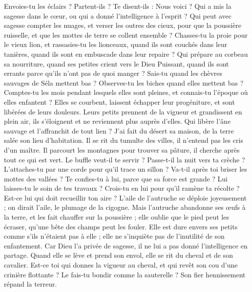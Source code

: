 \begin{multicols}{2}
Envoies-tu les éclairs ? Partent-ils ? Te disent-ils : Nous voici ?
Qui a mis la sagesse dans le cœur, ou qui a donné l'intelligence à l'esprit ?
Qui peut avec sagesse compter les nuages, et verser les outres des cieux,
pour que la poussière ruisselle, et que les mottes de terre se collent ensemble ?
\VerseOne{}Chasses-tu la proie pour le vieux lion, et rassasies-tu les lionceaux,
quand ils sont couchés dans leur tanières, quand ils sont en embuscade dans leur repaire ?
Qui prépare au corbeau sa nourriture, quand ses petites crient vers le Dieu Puissant, quand ils sont errants parce qu’ils n’ont pas de quoi manger ?
Sais-tu quand les chèvres sauvages de Séla mettent bas ? Observes-tu les biches quand elles mettent bas ?
Comptes-tu les mois pendant lesquels elles sont pleines, et connais-tu l'époque où elles enfantent ?
Elles se courbent, laissent échapper leur progéniture, et sont libérées de leurs douleurs.
Leurs petits prennent de la vigueur et grandissent en plein air, ils s'éloignent et ne reviennent plus auprès d'elles.
Qui libère l'âne sauvage et l'affranchit de tout lien ?
J'ai fait du désert sa maison, de la terre salée son lieu d'habitation.
Il se rit du tumulte des villes, il n'entend pas les cris d'un maître.
Il parcourt les montagnes pour trouver sa pâture, il cherche après tout ce qui est vert.
Le buffle veut-il te servir ? Passe-t-il la nuit vers ta crèche ?
L'attaches-tu par une corde pour qu'il trace un sillon ? Va-t-il après toi briser les mottes des vallées ?
Te confies-tu à lui, parce que sa force est grande ? Lui laisses-tu le soin de tes travaux ?
Crois-tu en lui pour qu'il ramène ta récolte ? Est-ce lui qui doit recueillir ton aire ?
L'aile de l'autruche se déploie joyeusement ; on dirait l'aile, le plumage de la cigogne.
Mais l'autruche abandonne ses œufs à la terre, et les fait chauffer sur la poussière ;
elle oublie que le pied peut les écraser, qu'une bête des champs peut les fouler.
Elle est dure envers ses petits comme s'ils n'étaient pas à elle ; elle ne s'inquiète pas de l'inutilité de son enfantement.
Car Dieu l'a privée de sagesse, il ne lui a pas donné l'intelligence en partage.
Quand elle se lève et prend son envol, elle se rit du cheval et de son cavalier.
Est-ce toi qui donnes la vigueur au cheval, et qui revêt son cou d'une crinière flottante ?
Le fais-tu bondir comme la sauterelle ? Son fier hennissement répand la terreur.

\end{multicols}

